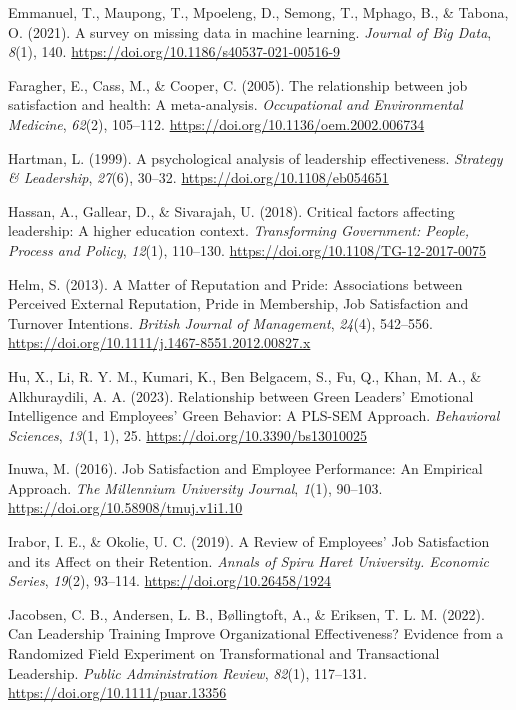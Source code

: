 \documentclass[
  man,
  longtable,
  nolmodern,
  notxfonts,
  notimes,
  colorlinks=true,linkcolor=blue,citecolor=blue,urlcolor=blue]{apa7}
\newlength{\cslhangindent}
\newenvironment{CSLReferences}[2] %
 {\begin{list}{}{%
  \setlength{\itemindent}{0pt}
  \setlength{\leftmargin}{0pt}
  \setlength{\parsep}{0pt}
  \ifodd #1
   \setlength{\leftmargin}{\cslhangindent}
   \setlength{\itemindent}{-1\cslhangindent}
  \fi
  \setlength{\itemsep}{#2\baselineskip}}}
 {\end{list}}
\begin{document}
\begin{CSLReferences}{1}{0}
Emmanuel, T., Maupong, T., Mpoeleng, D., Semong, T., Mphago, B., \&
Tabona, O. (2021). A survey on missing data in machine learning.
\emph{Journal of Big Data}, \emph{8}(1), 140.
\url{https://doi.org/10.1186/s40537-021-00516-9}

Faragher, E., Cass, M., \& Cooper, C. (2005). The relationship between
job satisfaction and health: A meta-analysis. \emph{Occupational and
Environmental Medicine}, \emph{62}(2), 105--112.
\url{https://doi.org/10.1136/oem.2002.006734}

Hartman, L. (1999). A psychological analysis of leadership
effectiveness. \emph{Strategy \& Leadership}, \emph{27}(6), 30--32.
\url{https://doi.org/10.1108/eb054651}

Hassan, A., Gallear, D., \& Sivarajah, U. (2018). Critical factors
affecting leadership: A higher education context. \emph{Transforming
Government: People, Process and Policy}, \emph{12}(1), 110--130.
\url{https://doi.org/10.1108/TG-12-2017-0075}

Helm, S. (2013). A {Matter} of {Reputation} and {Pride}: {Associations}
between {Perceived External Reputation}, {Pride} in {Membership}, {Job
Satisfaction} and {Turnover Intentions}. \emph{British Journal of
Management}, \emph{24}(4), 542--556.
\url{https://doi.org/10.1111/j.1467-8551.2012.00827.x}

Hu, X., Li, R. Y. M., Kumari, K., Ben Belgacem, S., Fu, Q., Khan, M. A.,
\& Alkhuraydili, A. A. (2023). Relationship between {Green Leaders}'
{Emotional Intelligence} and {Employees}' {Green Behavior}: {A PLS-SEM
Approach}. \emph{Behavioral Sciences}, \emph{13}(1, 1), 25.
\url{https://doi.org/10.3390/bs13010025}

Inuwa, M. (2016). Job {Satisfaction} and {Employee Performance}: {An
Empirical Approach}. \emph{The Millennium University Journal},
\emph{1}(1), 90--103. \url{https://doi.org/10.58908/tmuj.v1i1.10}

Irabor, I. E., \& Okolie, U. C. (2019). A {Review} of {Employees}' {Job
Satisfaction} and its {Affect} on their {Retention}. \emph{Annals of
Spiru Haret University. Economic Series}, \emph{19}(2), 93--114.
\url{https://doi.org/10.26458/1924}

Jacobsen, C. B., Andersen, L. B., Bøllingtoft, A., \& Eriksen, T. L. M.
(2022). Can {Leadership Training Improve Organizational Effectiveness}?
{Evidence} from a {Randomized Field Experiment} on {Transformational}
and {Transactional Leadership}. \emph{Public Administration Review},
\emph{82}(1), 117--131. \url{https://doi.org/10.1111/puar.13356}


\end{CSLReferences}
\end{document}
